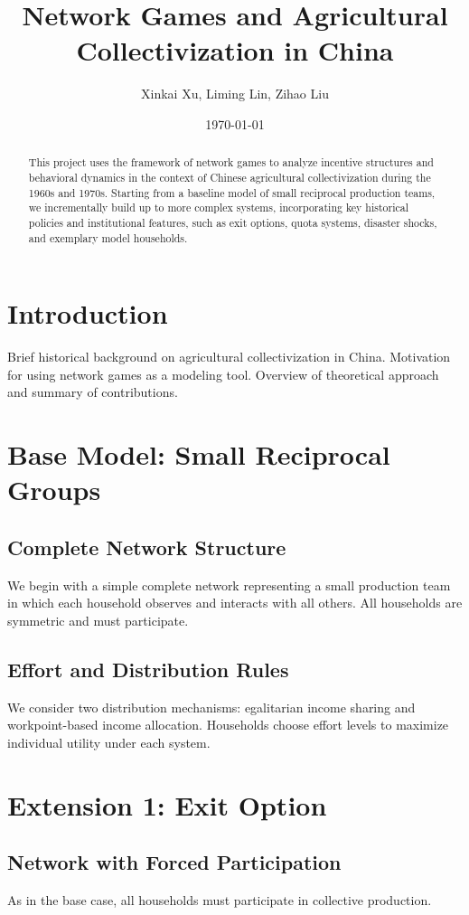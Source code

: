 \documentclass[12pt]{article}
\title{Network Games and Agricultural Collectivization in China}
\author{Xinkai Xu, Liming Lin, Zihao Liu}
\date{\today}
\begin{document}
\maketitle
\onehalfspacing

\begin{abstract}
This project uses the framework of network games to analyze incentive structures and behavioral dynamics in the context of Chinese agricultural collectivization during the 1960s and 1970s. Starting from a baseline model of small reciprocal production teams, we incrementally build up to more complex systems, incorporating key historical policies and institutional features, such as exit options, quota systems, disaster shocks, and exemplary model households.
\end{abstract}

\section{Introduction}
Brief historical background on agricultural collectivization in China. Motivation for using network games as a modeling tool. Overview of theoretical approach and summary of contributions.

\section{Base Model: Small Reciprocal Groups}
\subsection{Complete Network Structure}
We begin with a simple complete network representing a small production team in which each household observes and interacts with all others. All households are symmetric and must participate.

\subsection{Effort and Distribution Rules}
We consider two distribution mechanisms: egalitarian income sharing and workpoint-based income allocation. Households choose effort levels to maximize individual utility under each system.

\section{Extension 1: Exit Option}
\subsection{Network with Forced Participation}
As in the base case, all households must participate in collective production.
\end{document}
